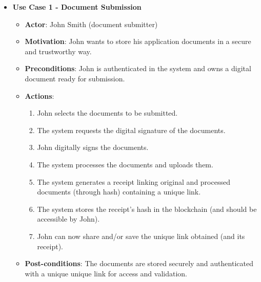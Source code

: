\documentclass[a4paper,11pt]{article}
\begin{document}
                \begin{itemize}
                    \item \textbf{Use Case 1 - Document Submission}
                    \begin{itemize}
                        \item \textbf{Actor}: John Smith (document submitter)
                        \item \textbf{Motivation}: John wants to store his application documents in a secure and trustworthy way.
                        \item \textbf{Preconditions}: John is authenticated in the system and owns a digital document ready for submission.
                        \item \textbf{Actions}:
                        \begin{enumerate}
                            \item John selects the documents to be submitted.
                            \item The system requests the digital signature of the documents.
                            \item John digitally signs the documents.
                            \item The system processes the documents and uploads them.
                            \item The system generates a receipt linking original and processed documents (through hash) containing a unique link.
                            \item The system stores the receipt's hash in the blockchain (and should be accessible by John).
                            \item John can now share and/or save the unique link obtained (and its receipt).
                        \end{enumerate}
                        \item \textbf{Post-conditions}: The documents are stored securely and authenticated with a unique unique link for access and validation.
                    \end{itemize}


\end{itemize}
\end{document}
